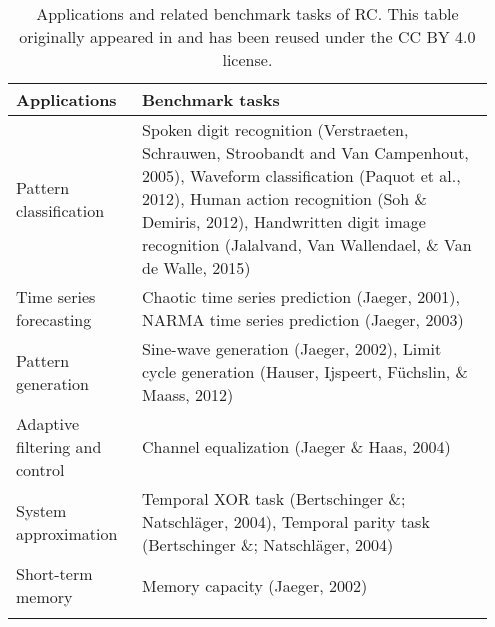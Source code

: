 \begin{table}[!ht]
    \raggedleft
    \caption{
        Applications and related benchmark tasks of RC. This table originally appeared in \citet{tanaka_recent_2019} and has been reused under the CC BY 4.0 license.
    }
    \begin{tabular}{p{0.25\linewidth}  p{0.7\linewidth}}
    \toprule
        \textbf{Applications} & \textbf{Benchmark tasks} \\ 
        \midrule
        Pattern classification & Spoken digit recognition (Verstraeten, Schrauwen, Stroobandt and Van Campenhout, 2005), 
        Waveform classification (Paquot et al., 2012), 
        Human action recognition (Soh \& Demiris, 2012),
        Handwritten digit image recognition (Jalalvand, Van Wallendael, \& Van de Walle, 2015) \\
        \arrayrulecolor{black!10!white}
        \midrule
        Time series forecasting & Chaotic time series prediction (Jaeger, 2001),
        NARMA time series prediction (Jaeger, 2003) \\
        \midrule
        Pattern generation & Sine-wave generation (Jaeger, 2002), 
        Limit cycle generation (Hauser, Ijspeert, Füchslin, \& Maass, 2012) \\
        \midrule
        Adaptive filtering and control & Channel equalization (Jaeger \& Haas, 2004) \\
        \midrule
        System approximation & Temporal XOR task (Bertschinger \&; Natschläger, 2004), 
        Temporal parity task (Bertschinger \&; Natschläger, 2004) \\
        \midrule
        Short-term memory & Memory capacity (Jaeger, 2002) \\
    \arrayrulecolor{black}
    \bottomrule
    \end{tabular}
    \label{table:rc-applications-benchmarks}
\end{table}